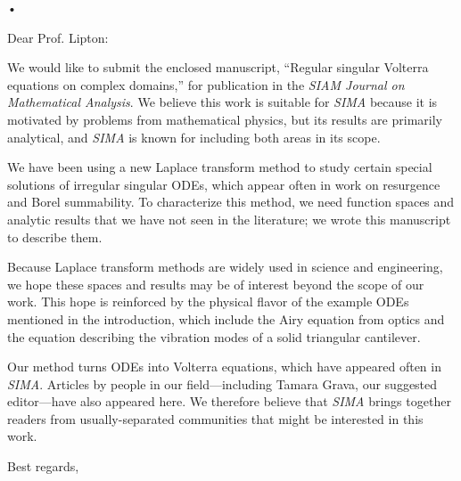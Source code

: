 •\documentclass{letter}
\date{Octobter 31, 2023}
\begin{document}
\begin{letter}{}
\opening{Dear Prof. Lipton:}

We would like to submit the enclosed manuscript, ``Regular singular Volterra equations on complex domains,'' for publication in the \textit{SIAM Journal on Mathematical Analysis}. We believe this work is suitable for \textit{SIMA} because it is motivated by problems from mathematical physics, but its results are primarily analytical, and \textit{SIMA} is known for including both areas in its scope.

We have been using a new Laplace transform method to study certain special solutions of irregular singular ODEs, which appear often in work on resurgence and Borel summability. To characterize this method, we need function spaces and analytic results that we have not seen in the literature; we wrote this manuscript to describe them.

Because Laplace transform methods are widely used in science and engineering, we hope these spaces and results may be of interest beyond the scope of our work. This hope is reinforced by the physical flavor of the example ODEs mentioned in the introduction, which include the Airy equation from optics and the equation describing
the vibration modes of a solid triangular cantilever.

Our method turns ODEs into Volterra equations, which have appeared often in \textit{SIMA}. Articles by people in our field---including Tamara Grava, our suggested editor---have also appeared here. We therefore believe that \textit{SIMA} brings together readers from usually-separated communities that might be interested in this work.
\closing{Best regards,}
\end{letter}
\end{document}
